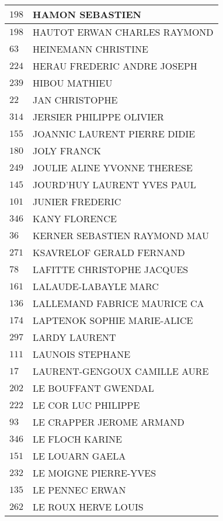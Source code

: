 \begin{xltabular}{\linewidth}{|l|X|}
    \hline
    $198$ & HAMON SEBASTIEN \\
    \hline
    $198$ & HAUTOT ERWAN CHARLES RAYMOND \\
    \hline
    $63$ & HEINEMANN CHRISTINE \\
    \hline
    $224$ & HERAU FREDERIC ANDRE JOSEPH \\
    \hline
    $239$ & HIBOU MATHIEU \\
    \hline
    $22$ & JAN CHRISTOPHE \\
    \hline
    $314$ & JERSIER PHILIPPE OLIVIER \\
    \hline
    $155$ & JOANNIC LAURENT PIERRE DIDIE \\
    \hline
    $180$ & JOLY FRANCK \\
    \hline
    $249$ & JOULIE ALINE YVONNE THERESE \\
    \hline
    $145$ & JOURD'HUY LAURENT YVES PAUL \\
    \hline
    $101$ & JUNIER FREDERIC \\
    \hline
    $346$ & KANY FLORENCE \\
    \hline
    $36$ & KERNER SEBASTIEN RAYMOND MAU \\
    \hline
    $271$ & KSAVRELOF GERALD FERNAND \\
    \hline
    $78$ & LAFITTE CHRISTOPHE JACQUES \\
    \hline
    $161$ & LALAUDE-LABAYLE MARC \\
    \hline
    $136$ & LALLEMAND FABRICE MAURICE CA \\
    \hline
    $174$ & LAPTENOK SOPHIE MARIE-ALICE \\
    \hline
    $297$ & LARDY LAURENT \\
    \hline
    $111$ & LAUNOIS STEPHANE \\
    \hline
    $17$ & LAURENT-GENGOUX CAMILLE AURE \\
    \hline
    $202$ & LE BOUFFANT GWENDAL \\
    \hline
    $222$ & LE COR LUC PHILIPPE \\
    \hline
    $93$ & LE CRAPPER JEROME ARMAND \\
    \hline
    $346$ & LE FLOCH KARINE \\
    \hline
    $151$ & LE LOUARN GAELA \\
    \hline
    $232$ & LE MOIGNE PIERRE-YVES \\
    \hline
    $135$ & LE PENNEC ERWAN \\
    \hline
    $262$ & LE ROUX HERVE LOUIS \\

\end{xltabular}
